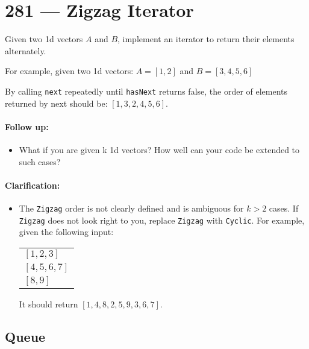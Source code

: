 \section{281 --- Zigzag Iterator}
Given two 1d vectors $A$ and $B$, implement an iterator to return their elements alternately.
\par
For example, given two 1d vectors:
$A = [1, 2]$ and $B = [3, 4, 5, 6]$
\par
By calling \texttt{next} repeatedly until \texttt{hasNext} returns false, the order of elements returned by next should be: $[1, 3, 2, 4, 5, 6]$.
\paragraph{Follow up:}
\begin{itemize}
    \item What if you are given k 1d vectors? How well can your code be extended to such cases?
\end{itemize}

\paragraph{Clarification:}
\begin{itemize}
    \item The \texttt{Zigzag} order is not clearly defined and is ambiguous for $k > 2$ cases. If \texttt{Zigzag} does not look right to you, replace \texttt{Zigzag} with \texttt{Cyclic}. For example, given the following input:
\begin{table}[H]
    \begin{tabular}{l}
        $[1,2,3]$   \\
        $[4,5,6,7]$ \\
        $[8,9]$
    \end{tabular}
\end{table}
It should return $[1,4,8,2,5,9,3,6,7]$.
\end{itemize}
\subsection{Queue}
